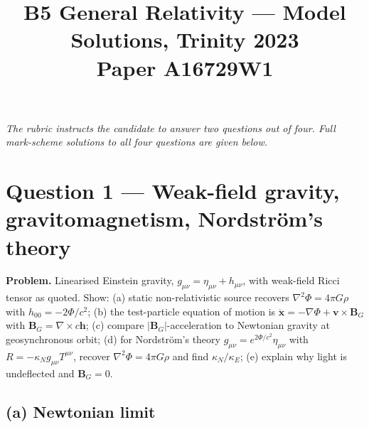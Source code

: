 \documentclass[11pt]{article}
\title{B5 General Relativity --- Model Solutions, Trinity 2023\\
\large Paper A16729W1}
\author{}
\date{}
\newcommand{\Lap}{\nabla^{2}}
\renewcommand{\vb}[1]{\mathbf{#1}}
\begin{document}
\maketitle

\medskip
\noindent\emph{The rubric instructs the candidate to answer two questions out of four.  Full mark-scheme solutions to all four questions are given below.}

\section*{Question 1 --- Weak-field gravity, gravitomagnetism, Nordstr\"om's theory}

\textbf{Problem.}  Linearised Einstein gravity, $g_{\mu\nu}=\eta_{\mu\nu}+h_{\mu\nu}$, with weak-field Ricci tensor as quoted.  Show: (a) static non-relativistic source recovers $\Lap\Phi=4\pi G\rho$ with $h_{00}=-2\Phi/c^{2}$; (b) the test-particle equation of motion is $\ddot{\vb x}=-\nabla\Phi+\vb v\times\vb B_{G}$ with $\vb B_{G}=\nabla\times c\vb h$; (c) compare $|\vb B_{G}|$-acceleration to Newtonian gravity at geosynchronous orbit; (d) for Nordstr\"om's theory $g_{\mu\nu}=e^{2\Phi/c^{2}}\eta_{\mu\nu}$ with $R=-\kappa_{N}g_{\mu\nu}T^{\mu\nu}$, recover $\Lap\Phi=4\pi G\rho$ and find $\kappa_{N}/\kappa_{E}$; (e) explain why light is undeflected and $\vb B_{G}=0$.

\subsection*{(a) Newtonian limit}
\end{document}
